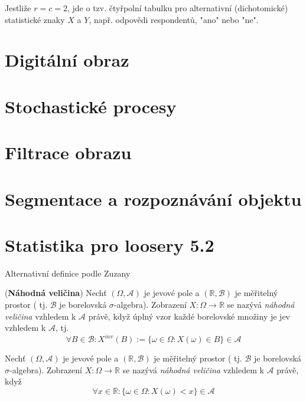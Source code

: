 Jestliže $r = c = 2$, jde o tzv. čtyřpolní tabulku pro alternativní (dichotomické) statistické znaky $X$ a $Y$, např. odpovědi respondentů, "ano" nebo "ne".

\section{Digitální obraz}

\section{Stochastické procesy}

\section{Filtrace obrazu}

\section{Segmentace a rozpoznávání objektu}



\section{Statistika pro loosery 5.2}
\begin{notes}
Alternativní definice podle Zuzany
\end{notes}
\begin{definition}{(\textbf{Náhodná veličina})}
Nechť $( \Omega, \mathcal{A}) $ je jevové pole a $(\mathbb{R}, \mathcal{B})$ je měřitelný prostor ( tj. $\mathcal{B}$ je borelovská $\sigma$-algebra). Zobrazení $X:\Omega \rightarrow \mathbb{R}$ se nazývá \textit{náhodná veličina} vzhledem k $\mathcal{A}$ právě, když úplný vzor každé borelovské množiny je jev vzhledem k $\mathcal{A}$, tj.
\begin{equation*}
\forall B \in \mathcal{B}: X^{inv }(B):=\{\omega\in \Omega : X(\omega)\in B \}\in \mathcal{A}
\end{equation*}
\end{definition}

\begin{theorem}
Nechť $( \Omega, \mathcal{A}) $ je jevové pole a $(\mathbb{R}, \mathcal{B})$ je měřitelný prostor ( tj. $\mathcal{B}$ je borelovská $\sigma$-algebra). Zobrazení $X:\Omega \rightarrow \mathbb{R}$ se nazývá \textit{náhodná veličina} vzhledem k $\mathcal{A}$ právě, když 
\begin{equation}
\forall x \in \mathbb{R} : \{ \omega \in \Omega: X(\omega)< x\}\in \mathcal{A}
\end{equation}
\end{theorem}


